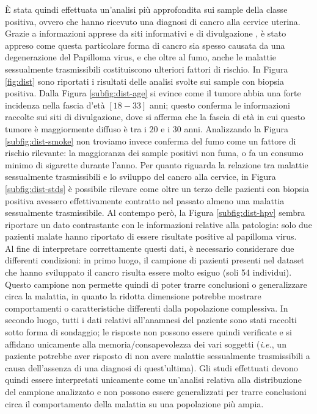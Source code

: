 È stata quindi effettuata un'analisi più approfondita sui sample della classe positiva, ovvero che hanno ricevuto una diagnosi di cancro alla cervice uterina.
Grazie a informazioni apprese da siti informativi e di divulgazione \cite{veronesi}, è stato appreso come questa particolare forma di cancro sia spesso causata da una degenerazione del Papilloma virus, e che oltre al fumo, anche le malattie sessualmente trasmissibili costituiscono ulteriori fattori di rischio.
In Figura \ref{fig:dist} sono riportati i risultati delle analisi svolte sui sample con biopsia positiva.
Dalla Figura \ref{subfig:dist-age} si evince come il tumore abbia una forte incidenza nella fascia d'età $[18-33]$ anni; questo conferma le informazioni raccolte sui siti di divulgazione, dove si afferma che la fascia di età in cui questo tumore è maggiormente diffuso è tra i $20$ e i $30$ anni.
Analizzando la Figura \ref{subfig:dist-smoke} non troviamo invece conferma del fumo come un fattore di rischio rilevante: la maggioranza dei sample positivi non fuma, o fa un consumo minimo di sigarette durante l'anno.
Per quanto riguarda la relazione tra malattie sessualmente trasmissibili e lo sviluppo del cancro alla cervice, in Figura \ref{subfig:dist-stds} è possibile rilevare come oltre un terzo delle pazienti con biopsia positiva avessero effettivamente contratto nel passato almeno una malattia sessualmente trasmissibile.
Al contempo però, la Figura \ref{subfig:dist-hpv} sembra riportare un dato contrastante con le informazioni relative alla patologia: solo due pazienti malate hanno riportato di essere risultate positive al papilloma virus.\\
Al fine di interpretare correttamente questi dati, è necessario considerare due differenti condizioni: in primo luogo, il campione di pazienti presenti nel dataset che hanno sviluppato il cancro risulta essere molto esiguo (soli 54 individui).
Questo campione non permette quindi di poter trarre conclusioni o generalizzare circa la malattia, in quanto la ridotta dimensione potrebbe mostrare comportamenti o caratteristiche differenti dalla popolazione complessiva.
In secondo luogo, tutti i dati relativi all'anamnesi del paziente sono stati raccolti sotto forma di sondaggio; le risposte non possono essere quindi verificate e si affidano unicamente alla memoria/consapevolezza dei vari soggetti (\textit{i.e.}, un paziente potrebbe aver risposto di non avere malattie sessualmente trasmissibili a causa dell'assenza di una diagnosi di quest'ultima).
Gli studi effettuati devono quindi essere interpretati unicamente come un'analisi relativa alla distribuzione del campione analizzato e non possono essere generalizzati per trarre conclusioni circa il comportamento della malattia su una popolazione più ampia.
